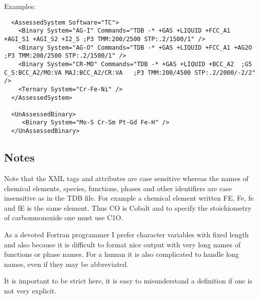 \documentclass{article}
\begin{document}
\bigskip

Examples:

\begin{verbatim}
  <AssessedSystem Software="TC">
    <Binary System="AG-I" Commands="TDB -* +GAS +LIQUID +FCC_A1 +AGI_S1 +AGI_S2 +I2_S ;P3 TMM:200/2500 STP:.2/1500/1" />
    <Binary System="AG-O" Commands="TDB -* +GAS +LIQUID +FCC_A1 +AG2O ;P3 TMM:200/2500 STP:.2/1500/1" />
    <Binary System="CR-MO" Commands="TDB -* +GAS +LIQUID +BCC_A2  ;G5 C_S:BCC_A2/MO:VA MAJ:BCC_A2/CR:VA   ;P3 TMM:200/4500 STP:.2/2000/-2/2" />
    <Ternary System="Cr-Fe-Ni" />
  </AssessedSystem>

  <UnAssessedBinary>
     <Binary System="Mo-S Cr-Sm Pt-Gd Fe-H" />
  </UnAssessedBinary>
\end{verbatim}

\newpage 

\subsection{Notes}\label{sec:notes}

Note that the XML tags and attributes are case sensitive whereas the
names of chemical elements, species, functions, phases and other
identifiers are case insensitive as in the TDB file.  For example a
chemical element written FE, Fe, fe and fE is the same element.  Thus
CO is Cobalt and to specify the stoichiometry of carbonmonoxide one
must use C1O.

As a devoted Fortran programmer I prefer character variables with
fixed length and also because it is difficult to format nice output
with very long names of functions or phase names.  For a human it is
also complicated to handle long names, even if they may be
abbreviated.

It is important to be strict here, it is easy to misunderstand a
definition if one is not very explicit.
\end{document}
